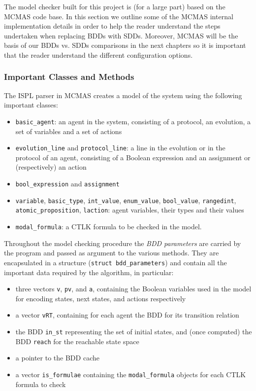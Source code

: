 \documentclass[11pt]{article}
\begin{document}
The model checker built for this project is (for a large part) based on the MCMAS code base. In this section we outline some of the MCMAS internal implementation details in order to help the reader understand the steps undertaken when replacing BDDs with SDDs. Moreover, MCMAS will be the basis of our BDDs vs. SDDs comparisons in the next chapters so it is important that the reader understand the different configuration options.

\subsubsection{Important Classes and Methods}
\label{MCMAS_steps}
The ISPL parser in MCMAS creates a model of the system using the following important classes: 
\begin{itemize}
\item \texttt{basic\_agent}: an agent in the system, consisting of a protocol, an evolution, a set of variables and a set of actions
\item \texttt{evolution\_line} and \texttt{protocol\_line}: a line in the evolution or in the protocol of an agent, consisting of a Boolean expression and an assignment or (respectively) an action
\item \texttt{bool\_expression} and \texttt{assignment}
\item \texttt{variable}, \texttt{basic\_type}, \texttt{int\_value}, \texttt{enum\_value}, \texttt{bool\_value},  \texttt{rangedint}, \texttt{atomic\_proposition}, \texttt{laction}: agent variables, their types and their values
\item \texttt{modal\_formula}: a CTLK formula to be checked in the model.
\end{itemize}
Throughout the model checking procedure the \textit{BDD parameters} are carried by the program and passed as argument to the various methods. They are encapsulated in a structure (\texttt{struct bdd\_parameters}) and contain all the important data required by the algorithm, in particular: 
\begin{itemize}
\item three vectors \texttt{v}, \texttt{pv}, and \texttt{a}, containing the Boolean variables used in the model for encoding states, next states, and actions respectively
\item a vector \texttt{vRT}, containing for each agent the BDD for its transition relation 
\item the BDD \texttt{in\_st} representing the set of initial states, and (once computed) the BDD \texttt{reach} for the reachable state space
\item a pointer to the BDD cache
\item a vector \texttt{is\_formulae} containing the \texttt{modal\_formula} objects for each CTLK formula to check
\end{itemize}
\end{document}
